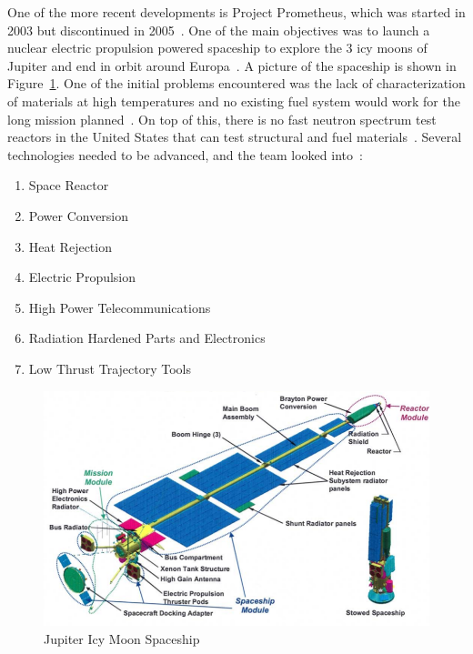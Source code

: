 \documentclass{article}
\begin{document}
One of the more recent developments is Project Prometheus, which was started in 2003 but discontinued in 2005~\cite{taylor2005prometheus}. One of the main objectives was to launch a nuclear electric propulsion powered spaceship to explore the 3 icy moons of Jupiter and end in orbit around Europa~\cite{edwards2012overview}. A picture of the spaceship is shown in Figure~\ref{appS}. One of the initial problems encountered was the lack of characterization of materials at high temperatures and no existing fuel system would work for the long mission planned~\cite{wollman2006prometheus}. On top of this, there is no fast neutron spectrum test reactors in the United States that can test structural and fuel materials~\cite{wollman2006prometheus}. Several technologies needed to be advanced, and the team looked into~\cite{taylor2005prometheus}:
\begin{enumerate}
\item Space Reactor
\item Power Conversion
\item Heat Rejection
\item Electric Propulsion
\item High Power Telecommunications
\item Radiation Hardened Parts and Electronics
\item Low Thrust Trajectory Tools
\end{enumerate}


\begin{figure}[]
	\centering
	\includegraphics[height=0.45\textheight]{fig/appS}
	\caption[Jupiter Icy Moon Spaceship]{Jupiter Icy Moon Spaceship~\cite{edwards2012overview}}
	\label{appS}
\end{figure}
\end{document}
